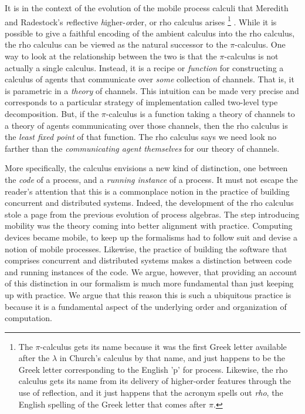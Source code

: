 It is in the context of the evolution of the mobile process calculi
that Meredith and Radestock's \emph{r}eflective
\emph{h}igher-\emph{o}rder, or rho calculus arises \footnote{The
$\pi$-calculus gets its name because it was the first Greek letter
available after the $\lambda$ in Church's calculus by that name, and
just happens to be the Greek letter corresponding to the English 'p'
for process. Likewise, the rho calculus gets its name from its
delivery of higher-order features through the use of reflection, and
it just happens that the acronym spells out \emph{rho}, the English
spelling of the Greek letter that comes after $\pi$.}
\cite{DBLP:journals/entcs/MeredithR05}. While it is possible to give a
faithful encoding of the ambient calculus into the rho calculus, the
rho calculus can be viewed as the natural successor to the
$\pi$-calculus. One way to look at the relationship between the two is
that the $\pi$-calculus is not actually a single calculus. Instead, it
is a recipe or \emph{function} for constructing a calculus of agents
that communicate over \emph{some} collection of channels. That is, it
is parametric in a \emph{theory} of channels. This intuition can be
made very precise and corresponds to a particular strategy of
implementation called two-level type decomposition. But, if the
$\pi$-calculus is a function taking a theory of channels to a theory
of agents communicating over those channels, then the rho calculus is
the \emph{least fixed point} of that function. The rho calculus says
we need look no farther than the \emph{communicating agent themselves}
for our theory of channels.

More specifically, the calculus envisions a new kind of distinction,
one between the \emph{code} of a process, and a \emph{running
instance} of a process. It must not escape the reader's attention that
this is a commonplace notion in the practice of building concurrent
and distributed systems. Indeed, the development of the rho calculus
stole a page from the previous evolution of process algebras. The step
introducing mobility was the theory coming into better alignment with
practice. Computing devices became mobile, to keep up the formalisms
had to follow suit and devise a notion of mobile processes. Likewise,
the practice of building the software that comprises concurrent and
distributed systems makes a distinction between code and running
instances of the code. We argue, however, that providing an account of
this distinction in our formalism is much more fundamental than just
keeping up with practice. We argue that this reason this is such a
ubiquitous practice is because it is a fundamental aspect of the
underlying order and organization of computation.

